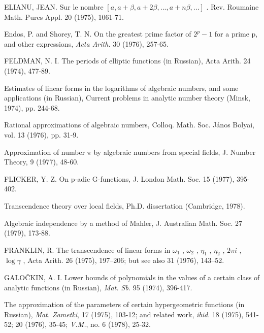 \begin{hanglist}
    \item ELIANU, JEAN. Sur le nombre  $[a, a + \beta, a + 2\beta, ..., a + n\beta, ...]$ . Rev. Roumaine Math. Pures Appl. 20 (1975), 1061-71.
    \item Endos, P. and Shorey, T. N. On the greatest prime factor of  $2^p-1$  for a prime p, and other expressions, \textit{Acta Arith.} 30 (1976), 257-65.
    \item FELDMAN, N. I. The periods of elliptic functions (in Russian), Acta Arith. 24 (1974), 477-89.
    \item \hspace{1.5em} Estimates of linear forms in the logarithms of algebraic numbers, and some applications (in Russian), Current problems in analytic number theory (Minsk, 1974), pp. 244-68.
    \item \hspace{1.5em} Rational approximations of algebraic numbers, Colloq. Math. Soc. János Bolyai, vol. 13 (1976), pp. 31-9.
    \item \hspace{1.5em} Approximation of number  $\pi$  by algebraic numbers from special fields, J. Number Theory, 9 (1977), 48-60.
    \item FLICKER, Y. Z. On p-adic G-functions, J. London Math. Soc. 15 (1977), 395-402.
    \item \hspace{1.5em} Transcendence theory over local fields, Ph.D. dissertation (Cambridge, 1978).
    \item \hspace{1.5em} Algebraic independence by a method of Mahler, J. Australian Math. Soc. 27 (1979), 173-88.
    \item FRANKLIN, R. The transcendence of linear forms in  $\omega_1$ ,  $\omega_2$ ,  $\eta_1$ ,  $\eta_2$ ,  $2\pi i$ ,  $\log \gamma$ , Acta Arith. 26 (1975), 197–206; but see also 31 (1976), 143–52.
    \item GALOČKIN, A. I. Lower bounds of polynomials in the values of a certain class of analytic functions (in Russian), \textit{Mat. Sb.} 95 (1974), 396-417.
    \item \hspace{1.5em} The approximation of the parameters of certain hypergeometric functions (in Russian), \textit{Mat. Zametki}, 17 (1975), 103-12; and related work, \textit{ibid}. 18 (1975), 541-52; 20 (1976), 35-45; \textit{V.M.}, no. 6 (1978), 25-32.

\end{hanglist}
